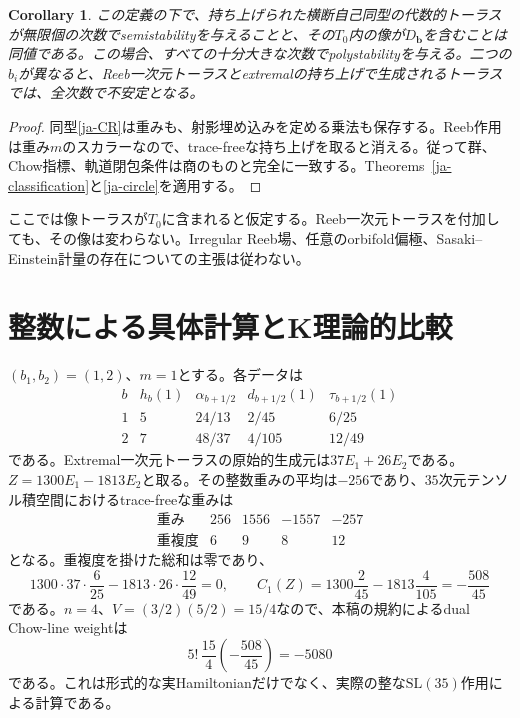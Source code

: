 \documentclass[12pt]{amsart}
\newtheorem{cor}[thm]{Corollary}
\theoremstyle{definition}
\theoremstyle{remark}
\numberwithin{equation}{section}
\begin{document}
\begin{cor}\label{ja-sasaki}
この定義の下で、持ち上げられた横断自己同型の代数的トーラスが無限個の次数でsemistabilityを与えることと、その$T_0$内の像が$D_{\boldsymbol b}$を含むことは同値である。この場合、すべての十分大きな次数でpolystabilityを与える。二つの$b_i$が異なると、Reeb一次元トーラスとextremalの持ち上げで生成されるトーラスでは、全次数で不安定となる。
\end{cor}
\begin{proof}
同型\eqref{ja-CR}は重みも、射影埋め込みを定める乗法も保存する。Reeb作用は重み$m$のスカラーなので、trace-freeな持ち上げを取ると消える。従って群、Chow指標、軌道閉包条件は商のものと完全に一致する。Theorems~\ref{ja-classification}と\ref{ja-circle}を適用する。
\end{proof}
ここでは像トーラスが$T_0$に含まれると仮定する。Reeb一次元トーラスを付加しても、その像は変わらない。Irregular Reeb場、任意のorbifold偏極、Sasaki--Einstein計量の存在についての主張は従わない。

\section{整数による具体計算とK理論的比較}

$(b_1,b_2)=(1,2)$、$m=1$とする。各データは
\[
\begin{array}{c|cccc}
 b&h_b(1)&\alpha_{b+1/2}&d_{b+1/2}(1)&\tau_{b+1/2}(1)\\ \hline
 1&5&24/13&2/45&6/25\\
 2&7&48/37&4/105&12/49
\end{array}
\]
である。Extremal一次元トーラスの原始的生成元は$37E_1+26E_2$である。$Z=1300E_1-1813E_2$と取る。その整数重みの平均は$-256$であり、$35$次元テンソル積空間におけるtrace-freeな重みは
\[
\begin{array}{c|rrrr}
\text{重み}&256&1556&-1557&-257\\
\text{重複度}&6&9&8&12
\end{array}
\]
となる。重複度を掛けた総和は零であり、
\[
1300\cdot37\cdot\frac6{25}
-1813\cdot26\cdot\frac{12}{49}=0,\qquad
C_1(Z)=1300\frac2{45}-1813\frac4{105}=-\frac{508}{45}
\]
である。$n=4$、$V=(3/2)(5/2)=15/4$なので、本稿の規約によるdual Chow-line weightは
\begin{equation}\label{ja-integerweight}
 5!\,\frac{15}{4}\left(-\frac{508}{45}\right)=-5080
\end{equation}
である。これは形式的な実Hamiltonianだけでなく、実際の整な$\mathrm{SL}(35)$作用による計算である。
\end{document}
